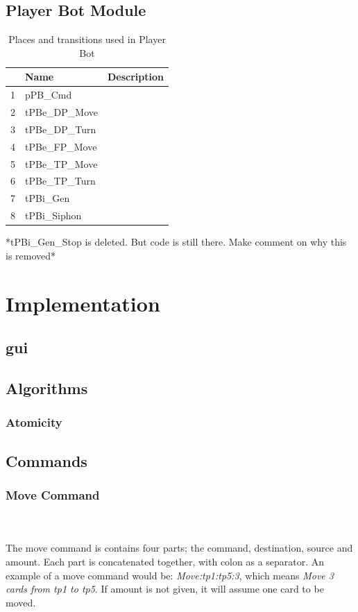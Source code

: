 \documentclass[runningheads,a4paper]{llncs}
\begin{document}
\subsection{Player Bot Module}
\begin{table}
	\caption{Places and transitions used in Player Bot}
	\begin{tabular}{|l|l|l|}
		\hline
		& Name & Description \\
		\hline
		1 & pPB\_Cmd          &  \\ \hline
		2 & tPBe\_DP\_Move    &  \\ \hline
		3 & tPBe\_DP\_Turn    &  \\ \hline
		4 & tPBe\_FP\_Move    &  \\ \hline
		5 & tPBe\_TP\_Move    &  \\ \hline
		6 & tPBe\_TP\_Turn    &  \\ \hline
		7 & tPBi\_Gen         &  \\ \hline
		8 & tPBi\_Siphon      &  \\ \hline
	\end{tabular}
\end{table}
*tPBi\_Gen\_Stop is deleted. But code is still there. Make comment on why this is removed*
\clearpage
\section{Implementation}
\label{sec:3_implementation}
\subsection{\ac{gui}}
\label{sec:3_gui}
\clearpage
\subsection{Algorithms}
\subsubsection{Atomicity}
\clearpage
\subsection{Commands}
\subsubsection{Move Command}~\\~\\
\label{sec:3_move_command}
The move command is contains four parts; the command, destination, source and amount. Each part is concatenated together, with colon as a separator. An example of a move command would be: \textit{Move:\ac{tp}1:\ac{tp}5:3}, which means \textit{Move 3 cards from \ac{tp}1 to \ac{tp}5}. If amount is not given, it will assume one card to be moved.
\newline
\end{document}

